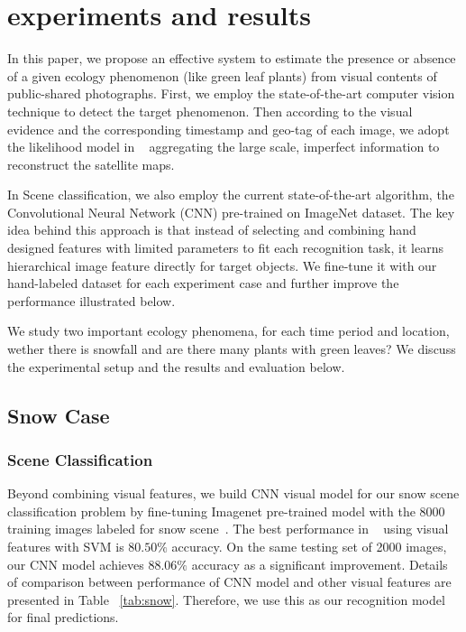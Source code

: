 \section{experiments and results}

In this paper, we propose an effective system to estimate the presence or absence 
of a given ecology phenomenon (like green leaf plants) 
from visual contents of public-shared photographs. First, we employ the state-of-the-art 
computer vision technique to detect the target phenomenon. Then according to the visual evidence 
and the corresponding timestamp and geo-tag of each image, we adopt the likelihood model in ~\cite{ecology2012www}
aggregating the large scale, imperfect information to reconstruct the satellite maps.

In Scene classification, we also employ the current state-of-the-art algorithm, 
the Convolutional Neural Network (CNN) pre-trained on ImageNet dataset. 
The key idea behind this approach is that instead of selecting and combining hand designed features 
with limited parameters to fit each recognition task, it learns hierarchical image feature directly 
for target objects.
We fine-tune it with our 
hand-labeled dataset for each experiment case and further improve the performance illustrated below.


We study two important ecology phenomena, for each time period and location, 
wether there is snowfall and are there many plants with green leaves? We discuss the experimental setup 
and the results and evaluation below.

\subsection{Snow Case}
\subsubsection{Scene Classification}
Beyond combining visual features, 
we build CNN visual model for our snow scene classification problem 
by fine-tuning Imagenet pre-trained model with the 8000 training images labeled for snow scene~\cite{wang2013observing}. The best 
performance in ~\cite{wang2013observing} using visual features with SVM is $80.50\%$ accuracy.
On the same testing set of 2000 images, our CNN model achieves $88.06\%$ accuracy as a significant 
improvement. Details of comparison between performance of CNN model
 and other visual features are presented in Table ~\ref{tab:snow}. Therefore, we use this as our recognition model for final predictions.

